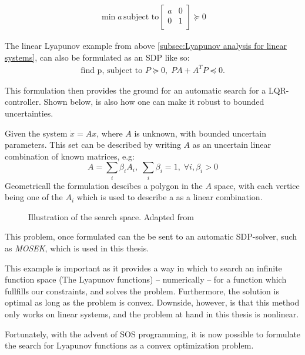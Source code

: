 \begin{align*}
  \min{a}\, \text{subject to}
  \begin{bmatrix}
    a & 0 \\
    0 & 1 \\
  \end{bmatrix}
  \succeq 0
\end{align*}\cite{tedrakeUnderactuatedRoboticsAlgorithms2019}

The linear Lyapunov example from above \ref{subsec:Lyapunov analysis for linear
  systems}, can also be formulated as an \ac{SDP} like so:
\begin{align*}
  \text{find p, subject to } P \succeq 0, \; PA + A^{T}P \preceq 0.
\end{align*}\cite{tedrakeUnderactuatedRoboticsAlgorithms2019}

This formulation then provides the ground for an automatic search for a
\ac{LQR}-controller. Shown below, is also how one can make it robust to bounded
uncertainties.

Given the system \(\dot{x} = Ax\), where \(A\) is unknown, with bounded
uncertain parameters. This set can be described by writing \(A\) as an uncertain
linear combination of known matrices, e.g:
\[
  A = \sum_{i} \beta_{i}A_{i}, \; \sum_{i}\beta_{i} = 1, \; \forall i,\beta_{i}
  > 0
\]
Geometricall the formulation descibes a polygon in the \(A\) space, with each
vertice being one of the \(A_{i}\) which is used to describe a as a linear
combination.

\begin{figure}
  \centering
  
  \caption{Illustration of the search space. Adapted
    from~\cite{tedrakeUnderactuatedRoboticsAlgorithms2019}}
\end{figure}


This problem, once formulated can the be sent to an automatic \ac{SDP}-solver,
such as \textit{MOSEK}\cite{mosek}, which is used in this thesis.

This example is important as it provides a way in which to search an infinite
function space (The Lyapunov functions) -- numerically -- for a function which
fullfills our constraints, and solves the problem. Furthermore, the solution is
optimal as long as the problem is convex. Downside, however, is that this method
only works on linear systems, and the problem at hand in this thesis is
nonlinear.

Fortunately, with the advent of \ac{SOS} programming, it is now possible to
formulate the search for Lyapunov functions as a convex optimization problem.

